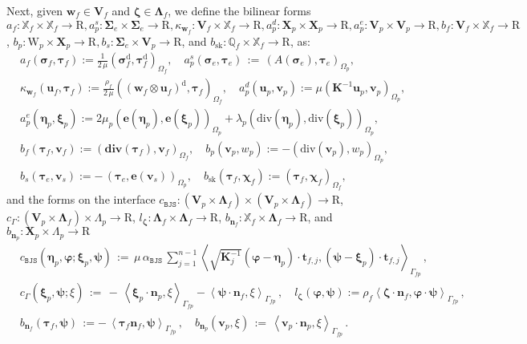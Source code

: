 \documentclass[11pt]{article}
\numberwithin{equation}{section}
\newcommand{\ds}{\displaystyle}
\newcommand{\bLambda}{{\boldsymbol\Lambda}}
\newcommand{\bbeta}{{\boldsymbol\eta}}
\newcommand{\bsi}{{\boldsymbol\sigma}}
\newcommand{\bSigma}{{\boldsymbol\Sigma}}
\newcommand{\bvarphi}{{\boldsymbol\varphi}}
\newcommand{\bpsi}{{\boldsymbol\psi}}
\newcommand{\btau}{{\boldsymbol\tau}}
\newcommand{\bzeta}{{\boldsymbol\zeta}}
\newcommand{\bchi}{{\boldsymbol\chi}}
\newcommand{\bxi}{{\boldsymbol\xi}}
\newcommand{\bv}{{\mathbf{v}}}
\newcommand{\bw}{{\mathbf{w}}}
\newcommand{\bu}{\mathbf{u}}
\newcommand{\bt}{{\mathbf{t}}}
\newcommand{\bn}{{\mathbf{n}}}
\newcommand{\be}{{\mathbf{e}}}
\newcommand{\0}{{\mathbf{0}}}
\def\bK{\mathbf{K}}
\def\bX{\mathbf{X}}
\def\bV{\mathbf{V}}
\newcommand\bbQ{\mathbb{Q}}
\newcommand\bbX{\mathbb{X}}
\def\R{\mathrm{R}}
\def\W{\mathrm{W}}
\def\rd{\mathrm{d}}
\def\BJS{\mathtt{BJS}}
\def\bdiv{\mathbf{div}}
\def\div{\mathrm{div}}
\def\pil{\left<}
\def\pir{\right>}
\def\sk{\mathrm{sk}}
\numberwithin{equation}{section}
\begin{document}
Next, given $\bw_f\in \bV_f$ and $\bzeta \in \bLambda_f$, we define the bilinear forms $a_f : \bbX_f\times \bbX_f\to \R, a^s_p : \bSigma_e\times \bSigma_e\to \R, \kappa_{\bw_f} : \bV_f\times \bbX_f\to \R, a^d_p : \bX_p\times \bX_p\to \R, a^e_p : \bV_p\times \bV_p\to \R, b_f : \bV_f\times \bbX_f\to \R$, $b_p : \W_p\times \bX_p\to \R, b_s : \bSigma_e \times \bV_p\to \R$, and $b_\sk : \bbQ_f\times \bbX_f\to \R$, as:
\begin{subequations}\label{eq:bilinear-forms}
\begin{align}
& a_f(\bsi_f,\btau_f) := \frac{1}{2\,\mu} (\bsi^\rd_f,\btau^\rd_f)_{\Omega_f} ,\quad a^s_p(\bsi_e,\btau_e) \,:=\, (A(\bsi_e),\btau_e)_{\Omega_p}, \label{bilinear-form-1} \\[0.5ex]
& \ds \kappa_{\bw_f}(\bu_f,\btau_f) := \frac{\rho_f}{2\,\mu} ((\bw_f\otimes\bu_f)^\rd, \btau_f)_{\Omega_f}, \quad a^d_p(\bu_p,\bv_p) := \mu (\bK^{-1}\bu_p,\bv_p)_{\Omega_p} , \label{bilinear-form-2}\\[0.5ex]
& \ds a^e_p(\bbeta_p,\bxi_p) := 2 \mu_p (\be(\bbeta_p),\be(\bxi_p))_{\Omega_p} + \lambda_p (\div(\bbeta_p),\div(\bxi_p))_{\Omega_p}, \label{bilinear-form-3}\\[0.5ex]
& \ds b_f(\btau_f,\bv_f) := (\bdiv(\btau_f),\bv_f)_{\Omega_f} ,\quad
b_p(\bv_p,w_p) := - (\div(\bv_p),w_p)_{\Omega_p} , \label{bilinear-form-4}\\[0.5ex]
& \ds b_s(\btau_e,\bv_s) := -\,(\btau_e,\be(\bv_s))_{\Omega_p},\quad
b_\sk(\btau_f,\bchi_f) := (\btau_f,\bchi_f)_{\Omega_f} , \label{bilinear-form-5}
\end{align}
\end{subequations}
and the forms on the interface $c_\BJS : (\bV_p\times \bLambda_f)\times (\bV_p\times \bLambda_f)\to \R$, $c_{\Gamma} : (\bV_p\times \bLambda_f)\times \Lambda_p\to \R$, $l_{\bzeta} : \bLambda_f \times \bLambda_f\to \R$, $b_{\bn_f} : \bbX_f\times \bLambda_f\to \R$, and $b_{\bn_p} : \bX_p\times \Lambda_p\to \R$
\begin{subequations}\label{eq:forms-on-interface-1}
\begin{align}
& c_{\BJS}(\bbeta_p, \bvarphi;\bxi_p, \bpsi) 
\,:=\, \mu\,\alpha_{\BJS}\,\sum^{n-1}_{j=1} \pil\sqrt{\bK^{-1}_j}( \bvarphi-\bbeta_p)\cdot\bt_{f,j},(\bpsi-\bxi_p)\cdot\bt_{f,j}\pir_{\Gamma_{fp}} \,, \label{interface-bilinear-form-1}\\[0.5ex]
& \ds c_{\Gamma}(\bxi_p,\bpsi;\xi) \,:=\, -\,\pil\bxi_p\cdot\bn_p,\xi\pir_{\Gamma_{fp}} - \pil\bpsi\cdot\bn_f,\xi\pir_{\Gamma_{fp}}\,,\quad
l_{\bzeta}(\bvarphi,\bpsi):=\rho_f\pil \bzeta\cdot\bn_f, \bvarphi\cdot\bpsi \pir_{\Gamma_{fp}} \,, \label{interface-bilinear-form-2}\\[0.5ex]
& \ds  b_{\bn_f}(\btau_f,\bpsi) \,:=-\, \pil\btau_f\bn_f,\bpsi\pir_{\Gamma_{fp}} \,,\quad
b_{\bn_p}(\bv_p,\xi) \,:=\, \pil\bv_p\cdot\bn_p, \xi\pir_{\Gamma_{fp}} 
\label{interface-bilinear-form-3} \,.
\end{align}
\end{subequations}
\end{document}
